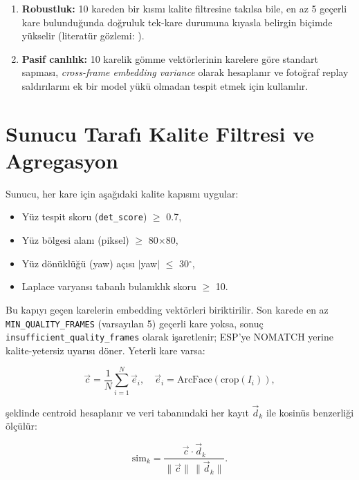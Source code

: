 \begin{enumerate}
    \item \textbf{Robustluk:} 10 kareden bir kısmı kalite filtresine
          takılsa bile, en az 5 geçerli kare bulunduğunda doğruluk
          tek-kare durumuna kıyasla belirgin biçimde yükselir
          (literatür gözlemi: \cite{chen2018multiframe}).
    \item \textbf{Pasif canlılık:} 10 karelik gömme vektörlerinin
          karelere göre standart sapması, \emph{cross-frame embedding
          variance} olarak hesaplanır ve fotoğraf replay saldırılarını
          ek bir model yükü olmadan tespit etmek için kullanılır.
\end{enumerate}

\section{Sunucu Tarafı Kalite Filtresi ve Agregasyon}

Sunucu, her kare için aşağıdaki kalite kapısını uygular:

\begin{itemize}
    \item Yüz tespit skoru (\texttt{det\_score}) $\geq$ 0.7,
    \item Yüz bölgesi alanı (piksel) $\geq$ 80$\times$80,
    \item Yüz dönüklüğü (yaw) açısı $|$yaw$|$ $\leq$ 30$^{\circ}$,
    \item Laplace varyansı tabanlı bulanıklık skoru $\geq$ 10.
\end{itemize}

Bu kapıyı geçen karelerin embedding vektörleri biriktirilir. Son karede
en az \texttt{MIN\_QUALITY\_FRAMES} (varsayılan 5) geçerli kare yoksa,
sonuç \texttt{insufficient\_quality\_frames} olarak işaretlenir; ESP'ye
NOMATCH yerine kalite-yetersiz uyarısı döner. Yeterli kare varsa:

\begin{equation}
\vec{c} = \frac{1}{N}\sum_{i=1}^{N} \vec{e}_i, \quad
\vec{e}_i = \mathrm{ArcFace}(\mathrm{crop}(I_i)),
\end{equation}

şeklinde centroid hesaplanır ve veri tabanındaki her kayıt $\vec{d}_k$
ile kosinüs benzerliği ölçülür:

\begin{equation}
\mathrm{sim}_k = \frac{\vec{c} \cdot \vec{d}_k}{\|\vec{c}\|\, \|\vec{d}_k\|}.
\end{equation}

